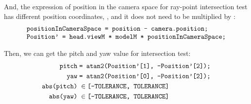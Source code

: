 And, the expression of position in the camera space for ray-point intersection test has different position coordinates, , and it does not need to be multiplied by :
\[
\begin{array}{lr}
\texttt{positionInCameraSpace = position - camera.position;}\\
\texttt{Position' = head.viewM * modelM * positionInCameraSpace;}\\
\end{array}
\]

Then, we can get the pitch and yaw value for intersection test:
\[
\begin{array}{lr}
\begin{aligned}
\texttt{pitch}\;&\texttt{= atan2(Position'[1], -Position'[2]);}\\
\texttt{yaw}\;&\texttt{= atan2(Position'[0], -Position'[2]);}\\
\texttt{abs(pitch)}\;&\in \texttt{[-TOLERANCE, TOLERANCE]}\\
\texttt{abs(yaw)}\;&\in \texttt{[-TOLERANCE, TOLERANCE]}\\
\end{aligned}
\end{array}
\]


